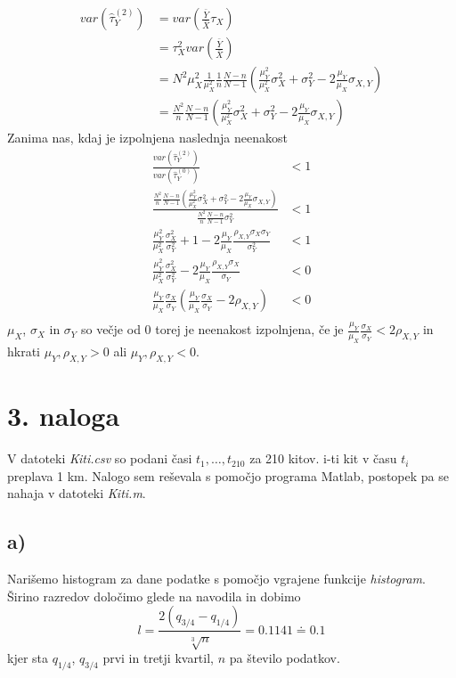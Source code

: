 \documentclass[A4paper, 11pt]{article}
\begin{document}
\[
\begin{split}
var(\hat{\tau}_Y ^ {(2)})  & = var( \frac{\bar{Y}}{\bar{X}} \tau_X ) \\
                                           & = \tau_X^2 var( \frac{\bar{Y}}{\bar{X}} ) \\
                                           & = N^2 \mu_X^2 \frac{1}{\mu_X^2} \frac{1}{n} \frac{N - n}{N - 1} (\frac{\mu_Y^2}{\mu_X^2} \sigma_X^2 + \sigma_Y^2 - 2 \frac{\mu_Y}{\mu_X} \sigma_{X,Y} ) \\
                                           & = \frac{N^2}{n} \frac{N - n}{N - 1} (\frac{\mu_Y^2}{\mu_X^2} \sigma_X^2 + \sigma_Y^2 - 2 \frac{\mu_Y}{\mu_X} \sigma_{X,Y} )
\end{split}
\]
%
Zanima nas, kdaj je izpolnjena naslednja neenakost
\[
\begin{split}
\frac{var(\hat{\tau}_Y ^ {(2)})}{var(\hat{\tau}_Y ^ {(0)})} & < 1 \\
\frac{ \frac{N^2}{n} \frac{N - n}{N - 1} (\frac{\mu_Y^2}{\mu_X^2} \sigma_X^2 + \sigma_Y^2 - 2 \frac{\mu_Y}{\mu_X} \sigma_{X,Y} )}{\frac{N^2}{n} \frac{N - n}{N - 1} \sigma_Y^2} & < 1 \\
\frac{\mu_Y^2}{\mu_X^2} \frac{\sigma_X^2}{\sigma_Y^2} + 1 - 2 \frac{\mu_Y}{\mu_X} \frac{\rho_{X,Y} \sigma_X \sigma_Y}{\sigma_Y^2} & < 1 \\
\frac{\mu_Y^2}{\mu_X^2} \frac{\sigma_X^2}{\sigma_Y^2} - 2 \frac{\mu_Y}{\mu_X} \frac{\rho_{X,Y} \sigma_X}{\sigma_Y} & < 0 \\
\frac{\mu_Y}{\mu_X} \frac{\sigma_X}{\sigma_Y} \left ( \frac{\mu_Y}{\mu_X} \frac{\sigma_X}{\sigma_Y} - 2 \rho_{X,Y} \right )  & < 0 \\ 
\end{split}
\]
$\mu_X$, $\sigma_X$ in $\sigma_Y$ so večje od 0 torej je neenakost izpolnjena, če je $\frac{\mu_Y}{\mu_X} \frac{\sigma_X}{\sigma_Y} < 2 \rho_{X,Y}$ in hkrati $\mu_Y, \rho_{X,Y} > 0$ ali $\mu_Y, \rho_{X,Y} < 0$. 


\section*{3. naloga}

V datoteki \textit{Kiti.csv} so podani časi $t_1, \ldots, t_{210}$ za 210 kitov. i-ti kit v času $t_i$ preplava 1 km. Nalogo sem reševala s pomočjo programa Matlab, postopek pa se nahaja v datoteki \textit{Kiti.m}.

\subsection*{a)}
Narišemo histogram za dane podatke s pomočjo vgrajene funkcije \textit{histogram}. Širino razredov določimo glede na navodila in dobimo 
\[ l = \frac{2(q_{3/4} - q_{1/4})}{\sqrt[3]{n}} = 0.1141 \doteq 0.1 \]
kjer sta $q_{1/4}$, $q_{3/4}$ prvi in tretji kvartil, $n$ pa število podatkov.
\end{document}
